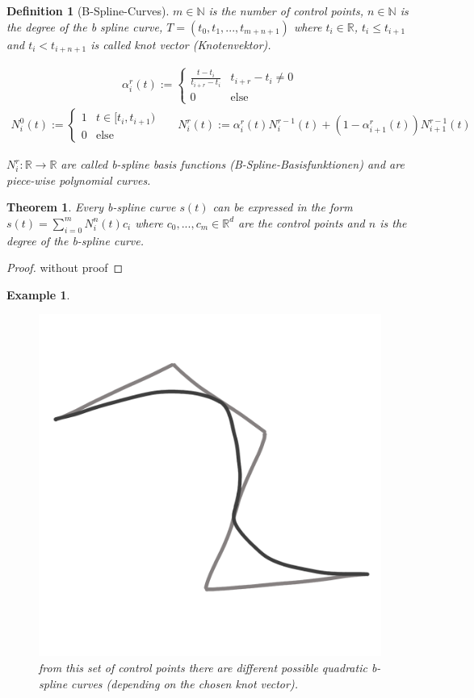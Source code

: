 \documentclass[]{article}
\newtheorem{theorem}{Theorem}
\newtheorem{definition}{Definition}
\newtheorem{example}{Example}
\begin{document}
\begin{definition}[B-Spline-Curves]
	$m\in \mathbb{N}$ is the number of control points, $n \in \mathbb{N}$ is the degree of the b spline curve, $T=(t_0, t_1, ..., t_{m+n+1})$ where $t_i \in \mathbb{R}$, $t_i \leq t_{i+1}$ and $t_i < t_{i+n+1}$ is called knot vector (Knotenvektor).
	
	\begin{align*}
		\alpha_i^r(t) := \begin{cases}
								\frac{t - t_i}{t_{i+r} - t_i} & t_{i+r} - t_i \neq 0\\
								0 & \text{else}
							\end{cases}
	\end{align*}
	\begin{align*}
		N_i^0(t) := \begin{cases}
						1 & t \in [t_i, t_{i+1})\\
						0 & \text{else}
					\end{cases} &&
		N_i^r(t) := \alpha_i^r(t) N_i^{r-1}(t) + (1-\alpha_{i+1}^r(t))N_{i+1}^{r-1}(t)
	\end{align*}
	
	$N_i^r:\mathbb{R} \rightarrow \mathbb{R}$ are called b-spline basis functions (B-Spline-Basisfunktionen) and are piece-wise polynomial curves.
\end{definition}

\begin{theorem}
	Every b-spline curve $s(t)$ can be expressed in the form $s(t) = \sum_{i=0}^{m} N_i^n(t) c_i$ where $c_0, ..., c_m \in \mathbb{R}^d$ are the control points and $n$ is the degree of the b-spline curve.
\end{theorem}

\begin{proof}
	without proof
\end{proof}

\begin{example}
	\begin{figure}[h!]
		\centering
		\includegraphics[width=0.3\linewidth]{figures/quadratic_b_spline}
		\caption{from this set of control points there are different possible quadratic b-spline curves (depending on the chosen knot vector).}
		\label{fig:quadratic_b_spline}
	\end{figure} 
\end{example}
\end{document}
